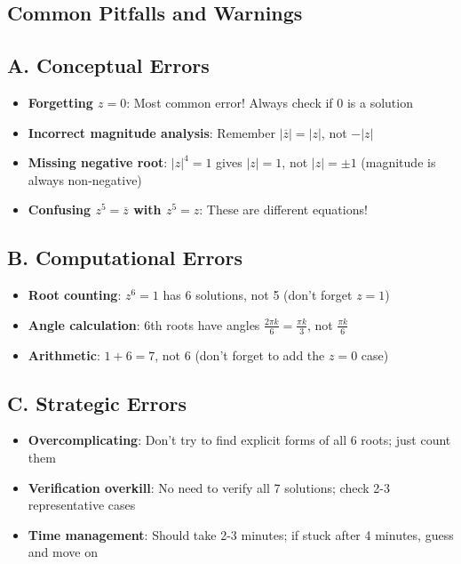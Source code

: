 \documentclass[11pt]{article}
\begin{document}
\begin{pitfallbox}
\section*{Common Pitfalls and Warnings}

\subsection*{A. Conceptual Errors}
\begin{itemize}[leftmargin=*]
    \item \textbf{Forgetting $z = 0$}: Most common error! Always check if 0 is a solution
    \item \textbf{Incorrect magnitude analysis}: Remember $|\overline{z}| = |z|$, not $-|z|$
    \item \textbf{Missing negative root}: $|z|^4 = 1$ gives $|z| = 1$, not $|z| = \pm 1$ (magnitude is always non-negative)
    \item \textbf{Confusing $z^5 = \overline{z}$ with $z^5 = z$}: These are different equations!
\end{itemize}

\subsection*{B. Computational Errors}
\begin{itemize}[leftmargin=*]
    \item \textbf{Root counting}: $z^6 = 1$ has 6 solutions, not 5 (don't forget $z = 1$)
    \item \textbf{Angle calculation}: 6th roots have angles $\frac{2\pi k}{6} = \frac{\pi k}{3}$, not $\frac{\pi k}{6}$
    \item \textbf{Arithmetic}: $1 + 6 = 7$, not 6 (don't forget to add the $z = 0$ case)
\end{itemize}

\subsection*{C. Strategic Errors}
\begin{itemize}[leftmargin=*]
    \item \textbf{Overcomplicating}: Don't try to find explicit forms of all 6 roots; just count them
    \item \textbf{Verification overkill}: No need to verify all 7 solutions; check 2-3 representative cases
    \item \textbf{Time management}: Should take 2-3 minutes; if stuck after 4 minutes, guess and move on
\end{itemize}


\end{pitfallbox}
\end{document}
